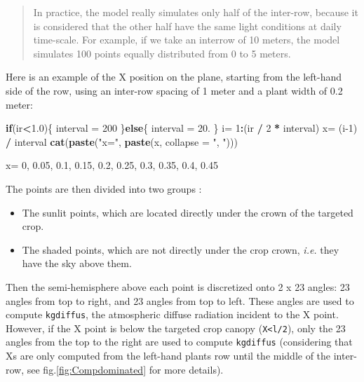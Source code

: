 \documentclass[]{book}
\newenvironment{Shaded}{\begin{snugshade}}{\end{snugshade}}
\newcommand{\ControlFlowTok}[1]{\textcolor[rgb]{0.13,0.29,0.53}{\textbf{#1}}}
\newcommand{\DataTypeTok}[1]{\textcolor[rgb]{0.13,0.29,0.53}{#1}}
\newcommand{\DecValTok}[1]{\textcolor[rgb]{0.00,0.00,0.81}{#1}}
\newcommand{\FloatTok}[1]{\textcolor[rgb]{0.00,0.00,0.81}{#1}}
\newcommand{\KeywordTok}[1]{\textcolor[rgb]{0.13,0.29,0.53}{\textbf{#1}}}
\newcommand{\NormalTok}[1]{#1}
\newcommand{\OperatorTok}[1]{\textcolor[rgb]{0.81,0.36,0.00}{\textbf{#1}}}
\newcommand{\StringTok}[1]{\textcolor[rgb]{0.31,0.60,0.02}{#1}}
\providecommand{\tightlist}{%
  \setlength{\itemsep}{0pt}\setlength{\parskip}{0pt}}
\begin{document}
\begin{quote}
In practice, the model really simulates only half of the inter-row, because it is considered that the other half have the same light conditions at daily time-scale. For example, if we take an interrow of 10 meters, the model simulates 100 points equally distributed from 0 to 5 meters.
\end{quote}

Here is an example of the X position on the plane, starting from the left-hand side of the row, using an inter-row spacing of 1 meter and a plant width of 0.2 meter:

\begin{Shaded}
\begin{Highlighting}[]
\ControlFlowTok{if}\NormalTok{(ir}\OperatorTok{<}\FloatTok{1.0}\NormalTok{)\{}
\NormalTok{  interval =}\StringTok{ }\DecValTok{200}
\NormalTok{\}}\ControlFlowTok{else}\NormalTok{\{}
\NormalTok{  interval =}\StringTok{ }\FloatTok{20.}
\NormalTok{\}}
\NormalTok{i=}\StringTok{ }\DecValTok{1}\OperatorTok{:}\NormalTok{(ir }\OperatorTok{/}\StringTok{ }\DecValTok{2} \OperatorTok{*}\StringTok{ }\NormalTok{interval)}
\NormalTok{x=}\StringTok{ }\NormalTok{(i}\DecValTok{-1}\NormalTok{) }\OperatorTok{/}\StringTok{ }\NormalTok{interval}
\KeywordTok{cat}\NormalTok{(}\KeywordTok{paste}\NormalTok{(}\StringTok{"x="}\NormalTok{, }\KeywordTok{paste}\NormalTok{(x, }\DataTypeTok{collapse =} \StringTok{", "}\NormalTok{)))}
\end{Highlighting}
\end{Shaded}

x= 0, 0.05, 0.1, 0.15, 0.2, 0.25, 0.3, 0.35, 0.4, 0.45

The points are then divided into two groups :

\begin{itemize}
\tightlist
\item
  The sunlit points, which are located directly under the crown of the targeted crop.
\item
  The shaded points, which are not directly under the crop crown, \emph{i.e.} they have the sky above them.
\end{itemize}

Then the semi-hemisphere above each point is discretized onto 2 x 23 angles: 23 angles from top to right, and 23 angles from top to left.
These angles are used to compute \texttt{kgdiffus}, the atmospheric diffuse radiation incident to the X point. However, if the X point is below the targeted crop canopy (\texttt{X\textless{}l/2}), only the 23 angles from the top to the right are used to compute \texttt{kgdiffus} (considering that Xs are only computed from the left-hand plants row until the middle of the inter-row, see fig.\ref{fig:Compdominated} for more details).
\end{document}
